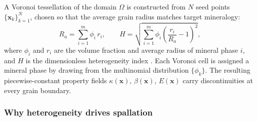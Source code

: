 \documentclass[12pt, a4paper]{article}
\newcommand{\vv}[1]{\bm{#1}}
\begin{document}
A Voronoi tessellation of the domain $\Omega$ is constructed from $N$ seed points
$\{\vv{x}_k\}_{k=1}^N$, chosen so that the average grain radius matches target
mineralogy:
\begin{equation}
    R_a = \sum_{i=1}^m \phi_i\,r_i, \qquad
    H = \sqrt{\sum_{i=1}^m \phi_i\!\left(\frac{r_i}{R_a}-1\right)^{\!2}},
    \label{eq:grain_size}
\end{equation}
where $\phi_i$ and $r_i$ are the volume fraction and average radius of mineral
phase $i$, and $H$ is the dimensionless heterogeneity index \citep{liu2023failure}.
Each Voronoi cell is assigned a mineral phase by drawing from the multinomial
distribution $\{\phi_k\}$.  The resulting piecewise-constant property fields
$\kappa(\vv{x})$, $\beta(\vv{x})$, $E(\vv{x})$ carry discontinuities at every
grain boundary.

\subsubsection{Why heterogeneity drives spallation}
\end{document}
